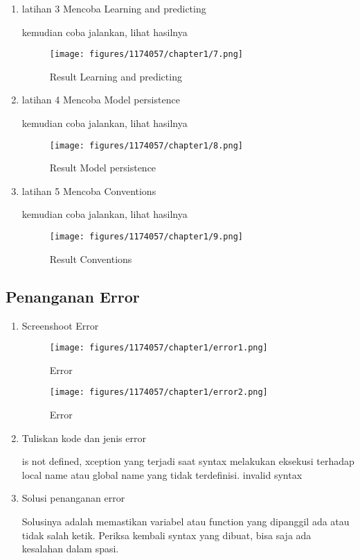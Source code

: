 \begin{enumerate}
		\item latihan 3 Mencoba Learning and predicting
		
		\par kemudian coba jalankan, lihat hasilnya
		\begin{figure}[H]
		\centering
		\texttt{[image: figures/1174057/chapter1/7.png]}
		\caption{Result Learning and predicting}
		\label{print}
		\end{figure}

		\item latihan 4 Mencoba Model persistence
		
		\par kemudian coba jalankan, lihat hasilnya
		\begin{figure}[H]
		\centering
		\texttt{[image: figures/1174057/chapter1/8.png]}
		\caption{Result Model persistence}
		\label{print}
		\end{figure}

		\item latihan 5 Mencoba Conventions
		
		\par kemudian coba jalankan, lihat hasilnya
		\begin{figure}[H]
		\centering
		\texttt{[image: figures/1174057/chapter1/9.png]}
		\caption{Result Conventions}
		\label{print}
		\end{figure}

	\end{enumerate}

\subsection{Penanganan Error}
	\begin{enumerate}
		\item Screenshoot Error
		\begin{figure}[H]
		\centering
		\texttt{[image: figures/1174057/chapter1/error1.png]}
		\caption{Error}
		\label{print}
		\end{figure}

		\begin{figure}[H]
		\centering
		\texttt{[image: figures/1174057/chapter1/error2.png]}
		\caption{Error}
		\label{print}
		\end{figure}

		\item Tuliskan kode dan jenis error

			\subitem is not defined, xception yang terjadi saat syntax melakukan eksekusi terhadap local name atau global name yang tidak terdeﬁnisi.
			\subitem invalid syntax

		\item Solusi penanganan error

			\subitem Solusinya adalah memastikan variabel atau function yang dipanggil ada atau tidak salah ketik. 
			\subitem Periksa kembali syntax yang dibuat, bisa saja ada kesalahan dalam spasi.
	\end{enumerate}


